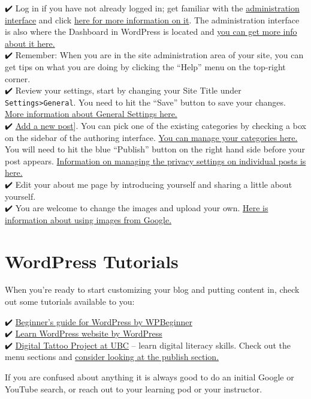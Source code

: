 \documentclass[
]{book}
\begin{document}
✔️ Log in if you have not already logged in; get familiar with the \href{http://sites.uci.edu/docs/start/dashboard/}{administration interface} and click \href{https://www.youtube.com/watch?v=-b569fs2t-Y}{here for more information on it}. The administration interface is also where the Dashboard in WordPress is located and \href{https://codex.wordpress.org/Dashboard_Screen}{you can get more info about it here.}\\
✔️ Remember: When you are in the site administration area of your site, you can get tips on what you are doing by clicking the ``Help'' menu on the top-right corner.\\
✔️ Review your settings, start by changing your Site Title under \texttt{Settings\textgreater{}General}. You need to hit the ``Save'' button to save your changes. \href{https://codex.wordpress.org/Settings_General_Screen}{More information about General Settings here.}\\
✔️ \href{http://www.wpbeginner.com/beginners-guide/how-to-add-a-new-post-in-wordpress-and-utilize-all-the-features/}{Add a new post}{]}. You can pick one of the existing categories by checking a box on the sidebar of the authoring interface. \href{http://www.wpbeginner.com/glossary/category/}{You can manage your categories here.} You will need to hit the blue ``Publish'' button on the right hand side before your post appears. \href{https://en.support.wordpress.com/pages/page-visibility/}{Information on managing the privacy settings on individual posts is here.}\\
✔️ Edit your about me page by introducing yourself and sharing a little about yourself.\\
✔️ You are welcome to change the images and upload your own. \href{https://www.youtube.com/watch?v=GtMOAaMFaPs}{Here is information about using images from Google.}

\hypertarget{wordpress-tutorials}{%
\section{WordPress Tutorials}\label{wordpress-tutorials}}

When you're ready to start customizing your blog and putting content in, check out some tutorials available to you:

✔️ \href{http://www.wpbeginner.com/start-here/}{Beginner's guide for WordPress by WPBeginner}\\
✔️ \href{https://learn.wordpress.com/}{Learn WordPress website by WordPress}\\
✔️ \href{http://digitaltattoo.ubc.ca/}{Digital Tattoo Project at UBC} -- learn digital literacy skills. Check out the menu sections and \href{http://digitaltattoo.ubc.ca/publish/}{consider looking at the publish section.}

If you are confused about anything it is always good to do an initial Google or YouTube search, or reach out to your learning pod or your instructor.

  
\end{document}
